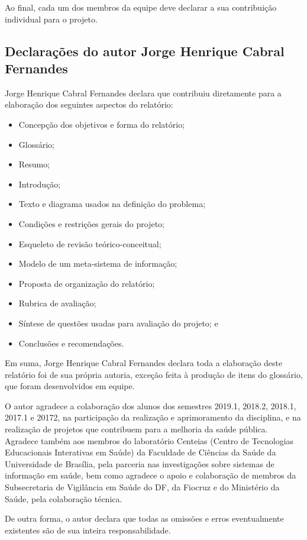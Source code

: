 \documentclass[12pt]{article}
\begin{document}
	Ao final, cada um dos membros da equipe deve declarar a sua contribuição individual para o projeto.
	
	\subsection{Declarações do autor Jorge Henrique Cabral Fernandes}
	
	Jorge Henrique Cabral Fernandes declara que contribuiu diretamente para a elaboração dos seguintes aspectos do relatório:
	\begin{itemize}
		\item Concepção dos objetivos e forma do relatório;
		\item Glossário;
		\item Resumo;
		\item Introdução;
		\item Texto e diagrama usados na definição do problema;
		\item Condições e restrições gerais do projeto;
		\item Esqueleto de revisão teórico-conceitual;
		\item Modelo de um meta-sistema de informação;
		\item Proposta de organização do relatório;
		\item Rubrica de avaliação;
		\item Síntese de questões usadas para avaliação do projeto; e
		\item Conclusões e recomendações.	
	\end{itemize}
	
	Em suma, Jorge Henrique Cabral Fernandes declara toda a elaboração deste relatório foi de sua própria autoria, exceção feita à produção de itens do glossário, que foram desenvolvidos em equipe.
	
	O autor agradece a colaboração dos alunos dos semestres 2019.1, 2018.2, 2018.1, 2017.1 e 20172, na participação da realização e aprimoramento da disciplina, e na realização de projetos que contribuem para a melhoria da saúde pública. Agradece também aos membros do laboratório Centeias (Centro de Tecnologias Educacionais Interativas em Saúde) da Faculdade de Ciências da Saúde da Universidade de Brasília, pela parceria nas investigações sobre sistemas de informação em saúde, bem como agradece o apoio e colaboração de membros da Subsecretaria de Vigilância em Saúde do DF, da Fiocruz e do Ministério da Saúde, pela colaboração técnica.
	
	De outra forma, o autor declara que todas as omissões e erros eventualmente existentes são de sua inteira responsabilidade.
	
\end{document}

